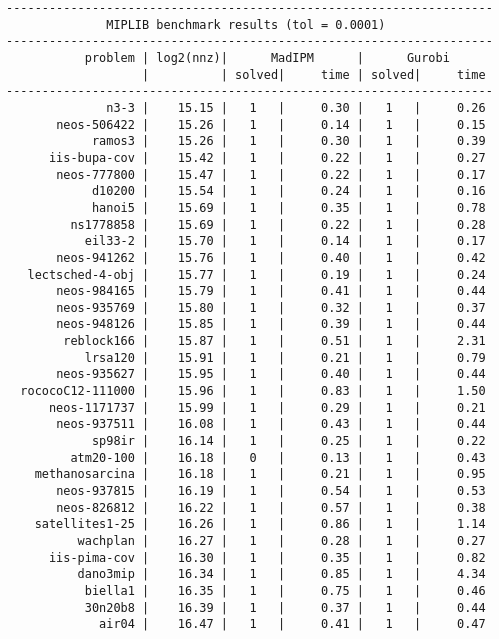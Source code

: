 \begin{lstlisting}
--------------------------------------------------------------------
              MIPLIB benchmark results (tol = 0.0001)
--------------------------------------------------------------------
           problem | log2(nnz)|      MadIPM      |      Gurobi        
                   |          | solved|     time | solved|     time     
--------------------------------------------------------------------
              n3-3 |    15.15 |   1   |     0.30 |   1   |     0.26
       neos-506422 |    15.26 |   1   |     0.14 |   1   |     0.15
            ramos3 |    15.26 |   1   |     0.30 |   1   |     0.39
      iis-bupa-cov |    15.42 |   1   |     0.22 |   1   |     0.27
       neos-777800 |    15.47 |   1   |     0.22 |   1   |     0.17
            d10200 |    15.54 |   1   |     0.24 |   1   |     0.16
            hanoi5 |    15.69 |   1   |     0.35 |   1   |     0.78
         ns1778858 |    15.69 |   1   |     0.22 |   1   |     0.28
           eil33-2 |    15.70 |   1   |     0.14 |   1   |     0.17
       neos-941262 |    15.76 |   1   |     0.40 |   1   |     0.42
   lectsched-4-obj |    15.77 |   1   |     0.19 |   1   |     0.24
       neos-984165 |    15.79 |   1   |     0.41 |   1   |     0.44
       neos-935769 |    15.80 |   1   |     0.32 |   1   |     0.37
       neos-948126 |    15.85 |   1   |     0.39 |   1   |     0.44
        reblock166 |    15.87 |   1   |     0.51 |   1   |     2.31
           lrsa120 |    15.91 |   1   |     0.21 |   1   |     0.79
       neos-935627 |    15.95 |   1   |     0.40 |   1   |     0.44
  rococoC12-111000 |    15.96 |   1   |     0.83 |   1   |     1.50
      neos-1171737 |    15.99 |   1   |     0.29 |   1   |     0.21
       neos-937511 |    16.08 |   1   |     0.43 |   1   |     0.44
            sp98ir |    16.14 |   1   |     0.25 |   1   |     0.22
         atm20-100 |    16.18 |   0   |     0.13 |   1   |     0.43
    methanosarcina |    16.18 |   1   |     0.21 |   1   |     0.95
       neos-937815 |    16.19 |   1   |     0.54 |   1   |     0.53
       neos-826812 |    16.22 |   1   |     0.57 |   1   |     0.38
    satellites1-25 |    16.26 |   1   |     0.86 |   1   |     1.14
          wachplan |    16.27 |   1   |     0.28 |   1   |     0.27
      iis-pima-cov |    16.30 |   1   |     0.35 |   1   |     0.82
          dano3mip |    16.34 |   1   |     0.85 |   1   |     4.34
           biella1 |    16.35 |   1   |     0.75 |   1   |     0.46
           30n20b8 |    16.39 |   1   |     0.37 |   1   |     0.44
             air04 |    16.47 |   1   |     0.41 |   1   |     0.47

\end{lstlisting}
